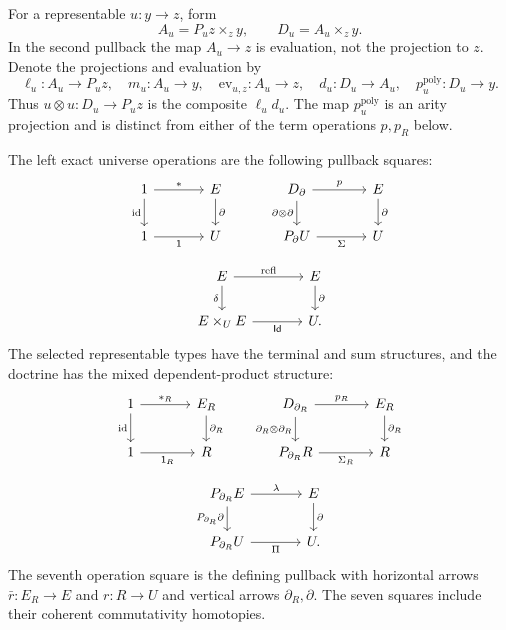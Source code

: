 \documentclass[oneside]{article}
\theoremstyle{plain}
\theoremstyle{definition}
\theoremstyle{remark}
\newcommand{\id}{\operatorname{id}}
\begin{document}
For a representable $u:y\to z$, form
\begin{equation}\label{eq:nu-poly-objects}
 A_u=P_uz\times_z y,
 \qquad
 D_u=A_u\times_z y.
\end{equation}
In the second pullback the map $A_u\to z$ is evaluation, not the
projection to $z$. Denote the projections and evaluation by
\[
 \ell_u:A_u\to P_uz,\quad m_u:A_u\to y,\quad
 \mathrm{ev}_{u,z}:A_u\to z,\quad
 d_u:D_u\to A_u,\quad p_u^{\mathrm{poly}}:D_u\to y.
\]
Thus $u\otimes u:D_u\to P_uz$ is the composite $\ell_ud_u$. The map
$p_u^{\mathrm{poly}}$ is an arity projection and is distinct from either
of the term operations $p,p_R$ below.

The left exact universe operations are the following pullback squares:
\begin{equation}\label{eq:nu-lex-squares}
\begin{gathered}
\begin{tikzcd}[column sep=large]
 1\ar[r,"*"]\ar[d,"\id"']&E\ar[d,"\partial"]&
 D_\partial\ar[r,"p"]\ar[d,"\partial\otimes\partial"']&E\ar[d,"\partial"]\\
 1\ar[r,"\mathsf 1"']&U&
 P_\partial U\ar[r,"\Sigma"']&U
\end{tikzcd}\\[6pt]
\begin{tikzcd}[column sep=large]
 E\ar[r,"\mathrm{refl}"]\ar[d,"\delta"']&E\ar[d,"\partial"]\\
 E\times_U E\ar[r,"\mathsf{Id}"']&U.
\end{tikzcd}
\end{gathered}
\end{equation}
The selected representable types have the terminal and sum structures,
and the doctrine has the mixed dependent-product structure:
\begin{equation}\label{eq:nu-relative-squares}
\begin{gathered}
\begin{tikzcd}[column sep=large]
 1\ar[r,"*_R"]\ar[d,"\id"']&E_R\ar[d,"\partial_R"]&
 D_{\partial_R}\ar[r,"p_R"]\ar[d,"\partial_R\otimes\partial_R"']&E_R\ar[d,"\partial_R"]\\
 1\ar[r,"\mathsf 1_R"']&R&
 P_{\partial_R}R\ar[r,"\Sigma_R"']&R
\end{tikzcd}\\[6pt]
\begin{tikzcd}[column sep=large]
 P_{\partial_R}E\ar[r,"\lambda"]\ar[d,"P_{\partial_R}\partial"']&E\ar[d,"\partial"]\\
 P_{\partial_R}U\ar[r,"\Pi"']&U.
\end{tikzcd}
\end{gathered}
\end{equation}
The seventh operation square is the defining pullback with horizontal
arrows $\bar r:E_R\to E$ and $r:R\to U$ and vertical arrows
$\partial_R,\partial$. The seven squares include their coherent
commutativity homotopies.
\end{document}
